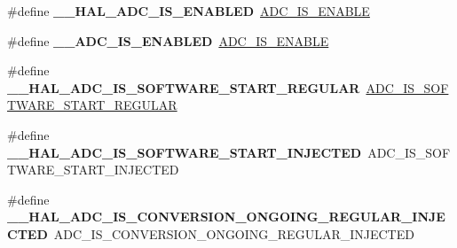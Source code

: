 \begin{DoxyCompactItemize}
\mbox{\label{group___h_a_l___a_d_c___aliased___macros_ga2c78554d5c9d8311297ea8fb01866309}} 
\#define {\bfseries \+\_\+\+\_\+\+H\+A\+L\+\_\+\+A\+D\+C\+\_\+\+I\+S\+\_\+\+E\+N\+A\+B\+L\+ED}~\hyperlink{group___a_d_c___private___macros_gafe3a7a04ff078c62ae98b19403f696c7}{A\+D\+C\+\_\+\+I\+S\+\_\+\+E\+N\+A\+B\+LE}
\item 
\mbox{\label{group___h_a_l___a_d_c___aliased___macros_ga32e5ccb7060b98a06749eb20d922d51b}} 
\#define {\bfseries \+\_\+\+\_\+\+A\+D\+C\+\_\+\+I\+S\+\_\+\+E\+N\+A\+B\+L\+ED}~\hyperlink{group___a_d_c___private___macros_gafe3a7a04ff078c62ae98b19403f696c7}{A\+D\+C\+\_\+\+I\+S\+\_\+\+E\+N\+A\+B\+LE}
\item 
\mbox{\label{group___h_a_l___a_d_c___aliased___macros_gad995b81efb72f4fe37152863d465bace}} 
\#define {\bfseries \+\_\+\+\_\+\+H\+A\+L\+\_\+\+A\+D\+C\+\_\+\+I\+S\+\_\+\+S\+O\+F\+T\+W\+A\+R\+E\+\_\+\+S\+T\+A\+R\+T\+\_\+\+R\+E\+G\+U\+L\+AR}~\hyperlink{group___a_d_c___private___macros_ga2ccb82ecf85d6c6d1ff2cdf9b6a82d2b}{A\+D\+C\+\_\+\+I\+S\+\_\+\+S\+O\+F\+T\+W\+A\+R\+E\+\_\+\+S\+T\+A\+R\+T\+\_\+\+R\+E\+G\+U\+L\+AR}
\item 
\mbox{\label{group___h_a_l___a_d_c___aliased___macros_ga5fa40578941f107c4ae1308e14266f7d}} 
\#define {\bfseries \+\_\+\+\_\+\+H\+A\+L\+\_\+\+A\+D\+C\+\_\+\+I\+S\+\_\+\+S\+O\+F\+T\+W\+A\+R\+E\+\_\+\+S\+T\+A\+R\+T\+\_\+\+I\+N\+J\+E\+C\+T\+ED}~A\+D\+C\+\_\+\+I\+S\+\_\+\+S\+O\+F\+T\+W\+A\+R\+E\+\_\+\+S\+T\+A\+R\+T\+\_\+\+I\+N\+J\+E\+C\+T\+ED
\item 
\mbox{\label{group___h_a_l___a_d_c___aliased___macros_ga573771917c650599112d38dc260f785b}} 
\#define {\bfseries \+\_\+\+\_\+\+H\+A\+L\+\_\+\+A\+D\+C\+\_\+\+I\+S\+\_\+\+C\+O\+N\+V\+E\+R\+S\+I\+O\+N\+\_\+\+O\+N\+G\+O\+I\+N\+G\+\_\+\+R\+E\+G\+U\+L\+A\+R\+\_\+\+I\+N\+J\+E\+C\+T\+ED}~A\+D\+C\+\_\+\+I\+S\+\_\+\+C\+O\+N\+V\+E\+R\+S\+I\+O\+N\+\_\+\+O\+N\+G\+O\+I\+N\+G\+\_\+\+R\+E\+G\+U\+L\+A\+R\+\_\+\+I\+N\+J\+E\+C\+T\+ED
\item 
\mbox{\label{group___h_a_l___a_d_c___aliased___macros_gaf6d1e4fb1fd1bca13b6c22953e805698}} 

\end{DoxyCompactItemize}
